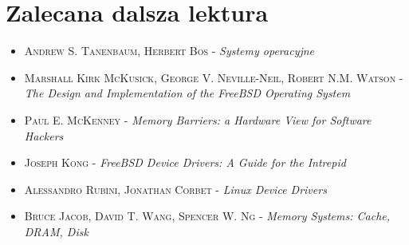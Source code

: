 \documentclass[shortabstract,inz]{iithesis}
\begin{document}
\chapter{Zalecana dalsza lektura} %
\begin{itemize}  
\item \textsc{Andrew S. Tanenbaum, Herbert Bos} - \textit{Systemy operacyjne} 
\item \textsc{Marshall Kirk McKusick, George V. Neville-Neil, Robert N.M. Watson} - \textit{The Design and Implementation of the FreeBSD Operating System}  
\item \textsc{Paul E. McKenney} - \textit{Memory Barriers: a Hardware View for Software Hackers}
\item \textsc{Joseph Kong} - \textit{FreeBSD Device Drivers: A Guide for the Intrepid}
\item \textsc{Alessandro Rubini, Jonathan Corbet} - \textit{Linux Device Drivers}
\item \textsc{Bruce Jacob, David T. Wang, Spencer W. Ng} - \textit{Memory Systems: Cache, DRAM, Disk}
\end{itemize}



\end{document}
